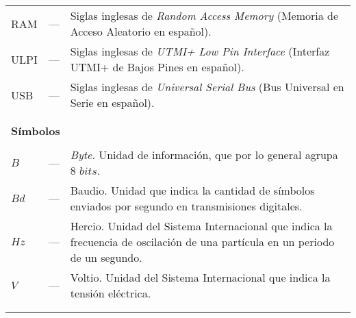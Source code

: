 \begin{longtable}{lcp{} }
RAM & --- & Siglas inglesas de \textit{Random Access Memory} (Memoria de Acceso Aleatorio en español).\\

ULPI & --- & Siglas inglesas de \textit{UTMI+ Low Pin Interface} (Interfaz UTMI+ de Bajos Pines en español).\\

USB & --- & Siglas inglesas de \textit{Universal Serial Bus} (Bus Universal en Serie en español).\\

\\
\\

\multicolumn{3}{l}{\textbf{Símbolos}}\\
\\
$B$ & --- & \emph{Byte}. Unidad de información, que por lo general agrupa 8 $bits$.\\

$Bd$ & --- & Baudio. Unidad que indica la cantidad de símbolos enviados por segundo en transmisiones digitales.\\

$Hz$ & --- & Hercio. Unidad del Sistema Internacional que indica la frecuencia de oscilación de una partícula en un periodo de un segundo.\\

$V$ & --- & Voltio. Unidad del Sistema Internacional que indica la tensión eléctrica.\\

\\
\\

\end{longtable}
